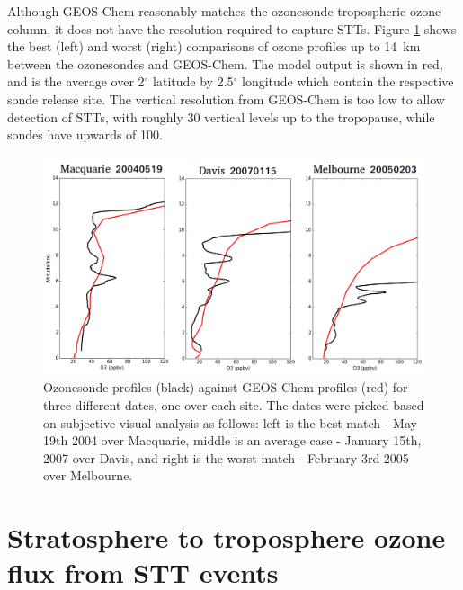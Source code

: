 \documentclass{article}
\begin{document}
  Although GEOS-Chem reasonably matches the ozonesonde tropospheric ozone column, it does not have the resolution required to capture STTs.
  Figure \ref{fig:event_profile_comparison} shows the best (left) and worst (right) comparisons of ozone profiles up to 14~km between the ozonesondes and GEOS-Chem.
  The model output is shown in red, and is the average over 2$^{\circ}$ latitude by 2.5$^{\circ}$ longitude which contain the respective sonde release site.
  The vertical resolution from GEOS-Chem is too low to allow detection of STTs, with roughly 30 vertical levels up to the tropopause, while sondes have upwards of 100.
  
  \begin{figure}[!htbp]
    \includegraphics[width=\textwidth]{figures/event_profile_comparison.png}
    \caption{Ozonesonde profiles (black) against GEOS-Chem profiles (red) for three different dates, one over each site.
    The dates were picked based on subjective visual analysis as follows: left is the best match - May 19th 2004 over Macquarie, middle is an average case - January 15th, 2007 over Davis, and right is the worst match - February 3rd 2005 over Melbourne.}
    \label{fig:event_profile_comparison}
  \end{figure}
  
\section{Stratosphere to troposphere ozone flux from STT events}
  
\end{document}
